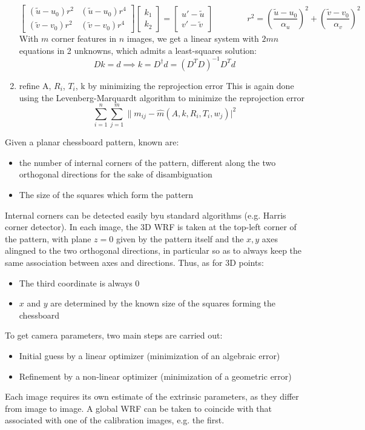 \documentclass{article}
\begin{document}
\begin{enumerate}
\[\begin{bmatrix}
            (\tilde u - u_0) r^2 & (\tilde u - u_0) r^4 \\
            (\tilde v - v_0) r^2 & (\tilde v - v_0) r^4
        \end{bmatrix} \begin{bmatrix}
            k_1 \\ k_2 
        \end{bmatrix} = \begin{bmatrix}
            u' - \tilde u \\
            v' - \tilde v
        \end{bmatrix} \qquad \qquad r^2 = \left(\displaystyle\frac{\tilde u - u_0}{\alpha_u}\right)^2 + \left(\displaystyle\frac{\tilde v - v_0}{\alpha_v}\right)^2
    \]
    With $m$ corner features in $n$ images, we get a linear system with $2mn$ equations in 2 unknowns, which admits a least-squares solution:
    \[
        Dk =d \implies k = D^\dagger d = (D^TD)^{-1}D^Td
    \]
    \item refine A, $R_i$, $T_i$, k by minimizing the reprojection error
        This is again done using the Levenberg-Marquardt algorithm to minimize the reprojection error
        \[
            \displaystyle\sum_{i=1}^{n} \displaystyle\sum_{j=1}^{m} \|m_{ij} - \hat{m}(A,k,R_i,T_i,w_j)|^2
        \]
\end{enumerate}

Given a planar chessboard pattern, known are:
\begin{itemize}
    \item the number of internal corners of the pattern, different along the two orthogonal directions for the sake of disambiguation
    \item The size of the squares which form the pattern
\end{itemize}
Internal corners can be detected easily byu standard algorithms (e.g. Harris corner detector). In each image, the 3D WRF is taken at the top-left corner of the pattern, with plane $z=0$ given by the pattern itself and the $x,y$ axes alingned to the two orthogonal directions, in particular so as to always keep the same association between axes and directions. Thus, as for 3D points:
\begin{itemize}
    \item The third coordinate is always 0 
    \item $x$ and $y$ are determined by the known size of the squares forming the chessboard 
\end{itemize}
To get camera parameters, two main steps are carried out: 
\begin{itemize}
    \item Initial guess by a linear optimizer (minimization of an algebraic error) 
    \item Refinement by a non-linear optimizer (minimization of a geometric error)
\end{itemize}
Each image requires its own estimate of the extrinsic parameters, as they differ from image to image. A global WRF can be taken to coincide with that associated with one of the calibration images, e.g. the first.
\end{document}
